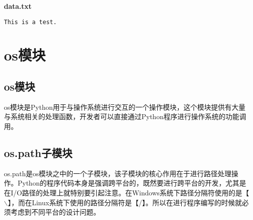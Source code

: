 \begin{tcolorbox}
	\textbf{data.txt}
	\begin{verbatim}
This is a test.
\end{verbatim}
\end{tcolorbox}

\newpage

\section{os模块}

\subsection{os模块}

os模块是Python用于与操作系统进行交互的一个操作模块，这个模块提供有大量与系统相关的处理函数，开发者可以直接通过Python程序进行操作系统的功能调用。

\begin{table}[H]
	\centering
	\caption{os模块}
\end{table}

\vspace{0.5cm}

\subsection{os.path子模块}

os.path是os模块之中的一个子模块，该子模块的核心作用在于进行路径处理操作。Python的程序代码本身是强调跨平台的，既然要进行跨平台的开发，尤其是在I/O路径的处理上就特别要引起注意。在Windows系统下路径分隔符使用的是【$ \backslash $】，而在Linux系统下使用的路径分隔符是【/】。所以在进行程序编写的时候就必须考虑到不同平台的设计问题。\\


